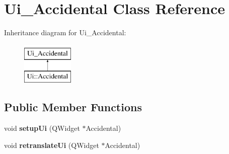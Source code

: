 \hypertarget{class_ui___accidental}{}\section{Ui\+\_\+\+Accidental Class Reference}
\label{class_ui___accidental}
Inheritance diagram for Ui\+\_\+\+Accidental\+:\begin{figure}[H]
\begin{center}
\leavevmode
\includegraphics[height=2.000000cm]{class_ui___accidental}
\end{center}
\end{figure}
\subsection*{Public Member Functions}
\begin{DoxyCompactItemize}
\item 
\mbox{\label{class_ui___accidental_a9212efb402b44ec4fc167646ed0443b3}} 
void {\bfseries setup\+Ui} (Q\+Widget $\ast$Accidental)
\item 
\mbox{\label{class_ui___accidental_a048d88e2eabdf4326bf974b6c1774ed0}} 
void {\bfseries retranslate\+Ui} (Q\+Widget $\ast$Accidental)
\end{DoxyCompactItemize}
